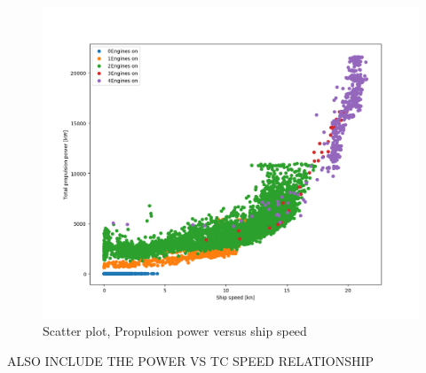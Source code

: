\documentclass[preprint,12pt]{elsarticle}
\begin{document}
\begin{figure}
	\centering
	\includegraphics[width=0.9\linewidth]{Figures/Pme_vs_vship_Neng}
	\caption{Scatter plot, Propulsion power versus ship speed}
	\label{fig:Pme_vs_vship_Neng}
\end{figure}

ALSO INCLUDE THE POWER VS TC SPEED RELATIONSHIP
\end{document}
